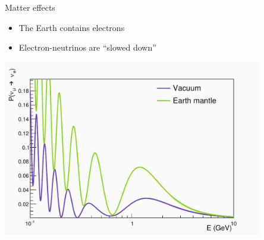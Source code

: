 \documentclass{beamer}
\begin{document}
\begin{frame}{Matter effects}

	\begin{itemize}
		\item The Earth contains electrons
		\item Electron-neutrinos are ``slowed down''
	\end{itemize}
		\includegraphics[width=0.85\textwidth]{matter.pdf}

\end{frame}
\end{document}
